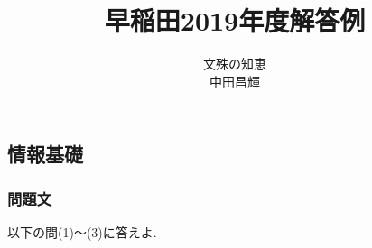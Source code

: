\documentclass[dvipdfmx,titlepage, 11pt, a4paper]{jsarticle}%
\title{\Huge 早稲田2019年度解答例\\[10mm]}
\author{{\LARGE 文殊の知恵}\\[1mm]\LARGE 中田昌輝}
\date{}
\begin{document}
\maketitle
\newpage
\setcounter{tocdepth}{3}%
\section{}
\subsection{情報基礎}
\subsubsection{問題文}
以下の問(1)〜(3)に答えよ.
\end{document}
